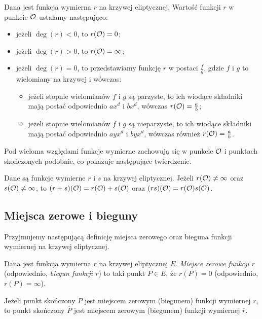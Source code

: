 \begin{definition}
Dana jest funkcja wymierna $r$ na krzywej eliptycznej.
Wartość funkcji $r$ w punkcie $\mathcal{O}$ ustalamy następująco:
\begin{itemize}
\item jeżeli $\deg(r) < 0$, to $r(\mathcal{O}) = 0$;
\item jeżeli $\deg(r) > 0$, to $r(\mathcal{O}) = \infty$;
\item jeżeli $\deg(r) = 0$,
to przedstawiamy funkcję $r$ w postaci $\frac{f}{g}$,
gdzie $f$ i $g$ to wielomiany na krzywej i wówczas:
\begin{itemize}
\item jeżeli stopnie wielomianów $f$ i $g$ są parzyste,
to ich wiodące składniki mają postać odpowiednio $ax^d$ i $bx^d$,
wówczas $r(\mathcal{O}) = \frac{a}{b}$;
\item jeżeli stopnie wielomianów $f$ i $g$ są nieparzyste,
to ich wiodące składniki mają postać odpowiednio $ayx^d$ i $byx^d$,
wówczas również $r(\mathcal{O}) = \frac{a}{b}$.
\end{itemize}
\end{itemize}
\end{definition}

\noindent
Pod wieloma względami funkcje wymierne zachowują się
w punkcie $\mathcal{O}$ i punktach skończonych podobnie,
co pokazuje następujące twierdzenie.

\begin{theorem}
Dane są funkcje wymierne $r$ i $s$ na krzywej eliptycznej.
Jeżeli $r(\mathcal{O}) \neq \infty$ oraz $s(\mathcal{O}) \neq \infty$,
to $(r + s)(\mathcal{O}) = r(\mathcal{O}) + s(\mathcal{O})$
oraz $(rs)(\mathcal{O}) = r(\mathcal{O})s(\mathcal{O})$.
\end{theorem}

\subsection*{Miejsca zerowe i bieguny}

\noindent
Przyjmujemy następującą definicję
miejsca zerowego oraz bieguna funkcji wymiernej na krzywej eliptycznej.

\begin{definition}
Dana jest funkcja wymierna $r$ na krzywej eliptycznej $E$.
\emph{Miejsce zerowe funkcji $r$} (odpowiednio, \emph{biegun funkcji $r$})
to taki punkt $P \in E$, że $r(P) = 0$ (odpowiednio, $r(P) = \infty$).
\end{definition}

\begin{fact}
Jeżeli punkt skończony $P$
jest miejscem zerowym (biegunem) funkcji wymiernej $r$,
to punkt skończony $\overline{P}$
jest miejscem zerowym (biegunem) funkcji wymiernej $\overline{r}$.
\end{fact}

